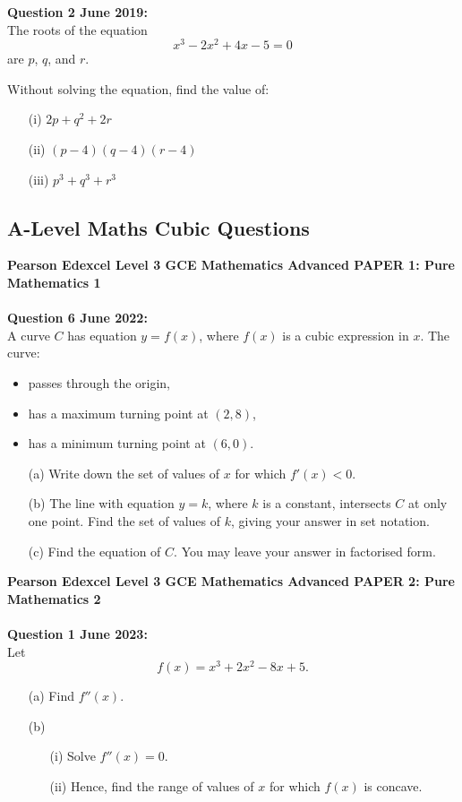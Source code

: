 \documentclass[12pt]{article}
\begin{document}
\textbf{Question 2 June 2019:}\\
The roots of the equation 
\[x^3 - 2x^2 + 4x - 5 = 0\]
are \( p \), \( q \), and \( r \).

Without solving the equation, find the value of:
\begin{enumerate}
    \item[(i)] \( 2p + q^2 + 2r \)
    \item[(ii)] \( (p - 4)(q - 4)(r - 4) \)
    \item[(iii)] \( p^3 + q^3 + r^3 \)
\end{enumerate}



\subsection{A-Level Maths Cubic Questions}

\textbf{Pearson Edexcel Level 3 GCE Mathematics
Advanced PAPER 1: Pure Mathematics 1}\\\\
\textbf{Question 6 June 2022:}\\
A curve \( C \) has equation \( y = f(x) \), where \( f(x) \) is a cubic expression in \( x \). The curve:
\begin{itemize}
    \item passes through the origin,
    \item has a maximum turning point at \( (2, 8) \),
    \item has a minimum turning point at \( (6, 0) \).
\end{itemize}
\begin{enumerate}
    \item[(a)] Write down the set of values of \( x \) for which \( f'(x) < 0 \).    
    \item[(b)] The line with equation \( y = k \), where \( k \) is a constant, intersects \( C \) at only one point. Find the set of values of \( k \), giving your answer in set notation.    
    \item[(c)] Find the equation of \( C \). You may leave your answer in factorised form.
\end{enumerate}


\textbf{Pearson Edexcel Level 3 GCE Mathematics
Advanced PAPER 2: Pure Mathematics 2}\\\\
\textbf{Question 1 June 2023:}\\
Let \[f(x) = x^3 + 2x^2 - 8x + 5.\]
\begin{enumerate}
    \item[(a)] Find \( f''(x) \). 
    \item[(b)] 
    \begin{enumerate}
        \item[(i)] Solve \( f''(x) = 0 \).
        \item[(ii)] Hence, find the range of values of \( x \) for which \( f(x) \) is concave.\\\\
    \end{enumerate}
\end{enumerate}
\end{document}
